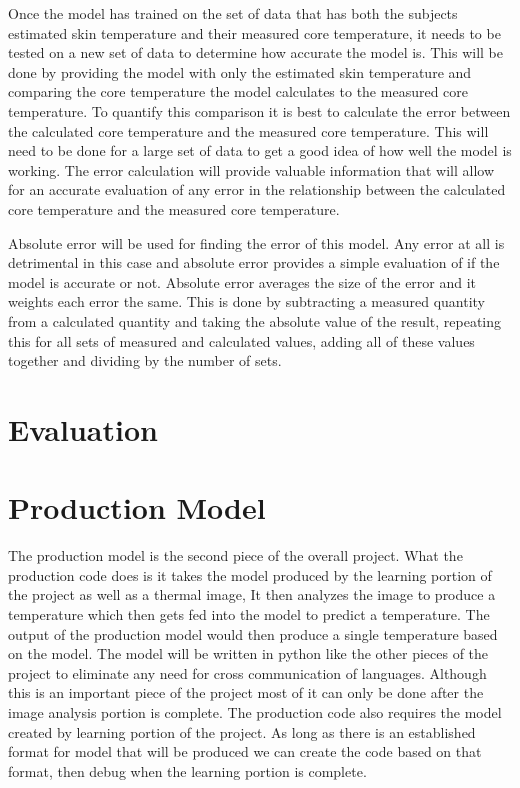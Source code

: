 ﻿\documentclass[onecolumn, draftclsnofoot,10pt, compsoc]{IEEEtran}
\begin{document}
Once the model has trained on the set of data that has both the subjects estimated skin temperature and their measured core temperature, it needs to be tested on a new set of data to determine how accurate the model is. This will be done by providing the model with only the estimated skin temperature and comparing the core temperature the model calculates to the measured core temperature. To quantify this comparison it is best to calculate the error between the calculated core temperature and the measured core temperature. This will need to be done for a large set of data to get a good idea of how well the model is working. The error calculation will provide valuable information that will allow for an accurate evaluation of any error in the relationship between the calculated core temperature and the measured core temperature. 

Absolute error will be used for finding the error of this model. Any error at all is detrimental in this case and absolute error provides a simple evaluation of if the model is accurate or not. Absolute error averages the size of the error and it weights each error the same. This is done by subtracting a measured quantity from a calculated quantity and taking the absolute value of the result, repeating this for all sets of measured and calculated values, adding all of these values together and dividing by the number of sets. 


\section{Evaluation}


\section{Production Model}
The production model is the second piece of the overall project. What the production code does is it takes the model produced by the learning portion of the project as well as a thermal image, It then analyzes the image to produce a temperature which then gets fed into the model to predict a temperature. The output of the production model would then produce a single temperature based on the model. The model will be written in python like the other pieces of the project to eliminate any need for cross communication of languages. Although this is an important piece of the project most of it can only be done after the image analysis portion is complete. The production code also requires the model created by learning portion of the project. As long as there is an established format for model that will be produced we can create the code based on that format, then debug when the learning portion is complete.
\end{document}
